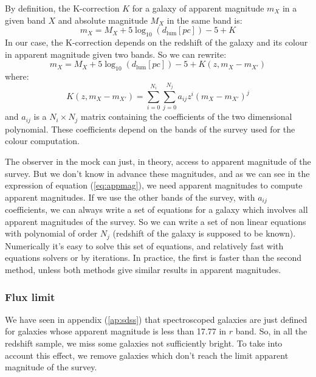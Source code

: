 By definition, the K-correction $K$ for a galaxy of apparent magnitude $m_X$ in
a given band $X$ and absolute magnitude $M_X$ in the same band is:
%
\begin{equation}
    {m_X}={M_X} + {5\log_{10}\left({d_{\mathrm{lum}}\left[pc\right]}\right)} - 5 + K
\end{equation}
%
In our case, the K-correction depends on the redshift of the galaxy and its
colour in apparent magnitude given two bands. So we can rewrite:
%
\begin{equation}\label{eq:appmag}
    m_X = M_X + 5\log_{10}\left({d_{\mathrm{lum}}\left[pc\right]}\right) - 5 + K( z, m_X - m_{X'} )
\end{equation}
%
where:
%
\begin{equation}
    K(z,m_{X}-{m}_{X'})=\sum_{i=0}^{N_i}\sum_{j=0}^{N_j}{a_{ij}}{z^i}{{(m_X-{m}_{X'})}^j}
\end{equation}
%
and $a_{ij}$ is a ${N_i}\times{N_j}$ matrix containing the coefficients of the
two dimensional polynomial. These coefficients depend on the bands of the
survey used for the colour computation.

The observer in the mock can just, in theory, access to apparent magnitude of
the survey. But we don't know in advance these magnitudes, and as we can see in
the expression of equation (\ref{eq:appmag}), we need apparent magnitudes to
compute apparent magnitudes. If we use the other bands of the survey, with
$a_{ij}$ coefficients, we can always write a set of equations for a galaxy
which involves all apparent magnitudes of the survey. So we can write a set of
non linear equations with polynomial of order $N_j$ (redshift of the galaxy is
supposed to be known). Numerically it's easy to solve this set of equations,
and relatively fast with equations solvers or by iterations. In practice, the
first is faster than the second method, unless both methods give similar
results in apparent magnitudes.
%
\subsubsection{Flux limit}
%
We have seen in appendix (\ref{ap:sdss}) that spectroscoped galaxies are just
defined for galaxies whose apparent magnitude is less than 17.77 in $r$
band. So, in all the redshift sample, we miss some galaxies not sufficiently
bright. To take into account this effect, we remove galaxies which don't reach
the limit apparent magnitude of the survey.
%
